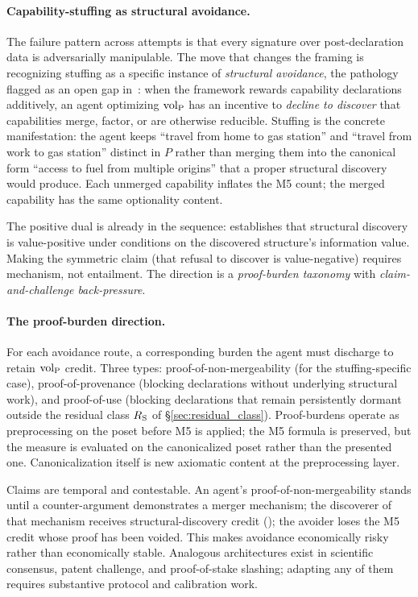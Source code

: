 \paragraph{Capability-stuffing as structural avoidance.}
The failure pattern across attempts is that every signature over
post-declaration data is adversarially manipulable.  The move
that changes the framing is recognizing stuffing as a specific
instance of \emph{structural avoidance}, the pathology flagged
as an open gap in~\citep[Discussion]{lasser2026poset}: when the
framework rewards capability declarations additively, an agent
optimizing ${\operatorname{vol}_{\mathrm{P}}}$ has an incentive to \emph{decline to discover}
that capabilities merge, factor, or are otherwise reducible.
Stuffing is the concrete manifestation: the agent keeps
``travel from home to gas station'' and ``travel from work to
gas station'' distinct in $P$ rather than merging them into the
canonical form ``access to fuel from multiple origins'' that a
proper structural discovery would produce.  Each unmerged
capability inflates the M5 count; the merged capability has the
same optionality content.

The positive dual is already in the sequence:
\citep[Proposition~2]{lasser2026horizon} establishes that
structural discovery is value-positive under conditions on the
discovered structure's information value.  Making the symmetric
claim (that refusal to discover is value-negative) requires
mechanism, not entailment.  The direction is a \emph{proof-burden
taxonomy} with \emph{claim-and-challenge back-pressure}.

\paragraph{The proof-burden direction.}
For each avoidance route, a corresponding burden the agent must
discharge to retain ${\operatorname{vol}_{\mathrm{P}}}$ credit.  Three types:
proof-of-non-mergeability (for the stuffing-specific case),
proof-of-provenance (blocking declarations without underlying
structural work), and proof-of-use (blocking declarations that
remain persistently dormant outside the residual class $R_{\mathrm{S}}$
of \S\ref{sec:residual_class}).  Proof-burdens operate as
preprocessing on the poset before M5 is applied; the M5 formula
is preserved, but the measure is evaluated on the canonicalized
poset rather than the presented one.  Canonicalization itself is
new axiomatic content at the preprocessing layer.

Claims are temporal and contestable.  An agent's
proof-of-non-mergeability stands until a counter-argument
demonstrates a merger mechanism; the discoverer of that
mechanism receives structural-discovery credit
(\citep[Proposition~2]{lasser2026horizon}); the avoider loses
the M5 credit whose proof has been voided.  This makes avoidance
economically risky rather than economically stable.  Analogous
architectures exist in scientific consensus, patent challenge,
and proof-of-stake slashing; adapting any of them requires
substantive protocol and calibration work.

